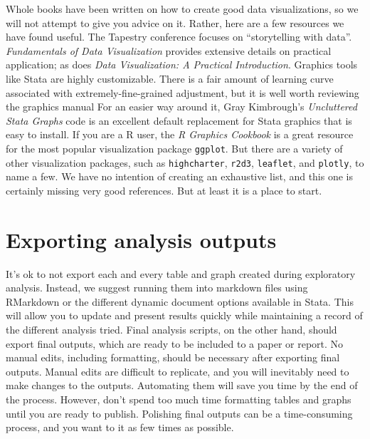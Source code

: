 Whole books have been written on how to create good data visualizations,
so we will not attempt to give you advice on it.
Rather, here are a few resources we have found useful.
The Tapestry conference focuses on ``storytelling with data''.
\textit{Fundamentals of Data Visualization} provides extensive details on practical application;
as does \textit{Data Visualization: A Practical Introduction}.
Graphics tools like Stata are highly customizable.
There is a fair amount of learning curve associated with extremely-fine-grained adjustment,
but it is well worth reviewing the graphics manual
For an easier way around it, Gray Kimbrough's \textit{Uncluttered Stata Graphs} code is an excellent default replacement for Stata graphics that is easy to install.
If you are a R user, the \textit{R Graphics Cookbook} 
is a great resource for the most popular visualization package \texttt{ggplot}. 
But there are a variety of other visualization packages, 
such as \texttt{highcharter}, 
\texttt{r2d3}, 
\texttt{leaflet}, 
and \texttt{plotly}, to name a few.
We have no intention of creating an exhaustive list, and this one is certainly missing very good references.
But at least it is a place to start.

\section{Exporting analysis outputs}

It's ok to not export each and every table and graph created during exploratory analysis. 
Instead, we suggest running them into markdown files using RMarkdown or the different dynamic document options available in Stata. 
This will allow you to update and present results quickly while maintaining a record of the different analysis tried. 
Final analysis scripts, on the other hand, should export final outputs, which are ready to be included to a paper or report.
No manual edits, including formatting, should be necessary after exporting final outputs. 
Manual edits are difficult to replicate, and you will inevitably need to make changes to the outputs. 
Automating them will save you time by the end of the process. 
However, don't spend too much time formatting tables and graphs until you are ready to publish.
Polishing final outputs can be a time-consuming process, 
and you want to it as few times as possible.

